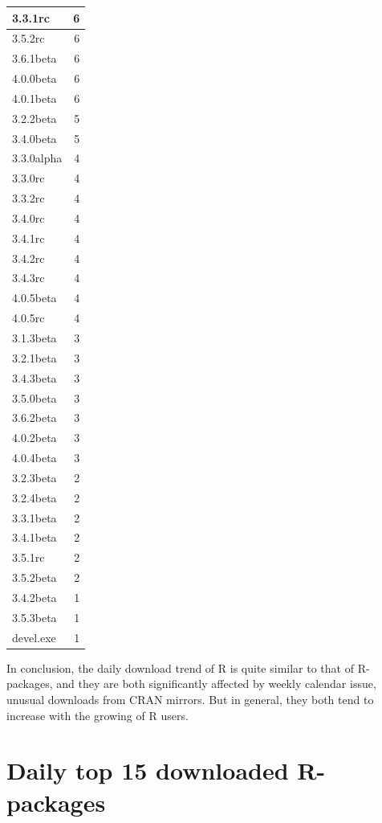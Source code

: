 \documentclass[
]{book}
\begin{document}
\begin{table}
\begin{tabular}[t]{l|r}
\hline
3.3.1rc & 6\\
\hline
3.5.2rc & 6\\
\hline
3.6.1beta & 6\\
\hline
4.0.0beta & 6\\
\hline
4.0.1beta & 6\\
\hline
3.2.2beta & 5\\
\hline
3.4.0beta & 5\\
\hline
3.3.0alpha & 4\\
\hline
3.3.0rc & 4\\
\hline
3.3.2rc & 4\\
\hline
3.4.0rc & 4\\
\hline
3.4.1rc & 4\\
\hline
3.4.2rc & 4\\
\hline
3.4.3rc & 4\\
\hline
4.0.5beta & 4\\
\hline
4.0.5rc & 4\\
\hline
3.1.3beta & 3\\
\hline
3.2.1beta & 3\\
\hline
3.4.3beta & 3\\
\hline
3.5.0beta & 3\\
\hline
3.6.2beta & 3\\
\hline
4.0.2beta & 3\\
\hline
4.0.4beta & 3\\
\hline
3.2.3beta & 2\\
\hline
3.2.4beta & 2\\
\hline
3.3.1beta & 2\\
\hline
3.4.1beta & 2\\
\hline
3.5.1rc & 2\\
\hline
3.5.2beta & 2\\
\hline
3.4.2beta & 1\\
\hline
3.5.3beta & 1\\
\hline
devel.exe & 1\\
\hline
\end{tabular}
\end{table}

In conclusion, the daily download trend of R is quite similar to that of R-packages, and they are both significantly affected by weekly calendar issue, unusual downloads from CRAN mirrors. But in general, they both tend to increase with the growing of R users.

\hypertarget{daily-top-15-downloaded-r-packages}{%
\section{Daily top 15 downloaded R-packages}\label{daily-top-15-downloaded-r-packages}}
\end{document}
